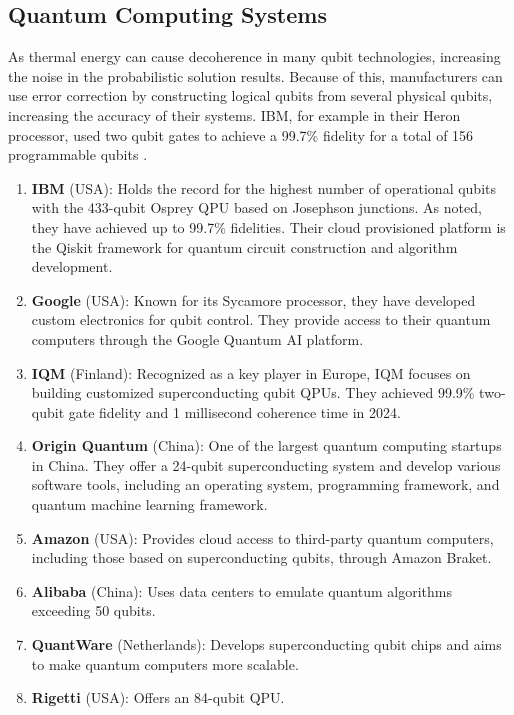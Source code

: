 \subsection{Quantum Computing Systems}

As thermal energy can cause decoherence in many qubit technologies, increasing the noise in the probabilistic solution
results.
Because of this, manufacturers can use error correction by constructing logical qubits from several physical qubits,
increasing the accuracy of their systems.
IBM, for example in their Heron processor, used two qubit gates to achieve a 99.7\% fidelity for a total of 156
programmable qubits \cite{IBM:heronr2:2024}.  

\begin{enumerate}
\item \textbf{IBM} (USA): Holds the record for the highest number of operational qubits with the 433-qubit Osprey QPU
  \cite{IBM:ossprey:2024} based on Josephson junctions.
  As noted, they have achieved up to 99.7\% fidelities.
  Their cloud provisioned platform is the Qiskit \cite{Qiskit:2023} framework for quantum circuit construction and
  algorithm development.
\item \textbf{Google} (USA): Known for its Sycamore processor, they have developed custom electronics for qubit control.
  They provide access to their quantum computers through the Google Quantum AI platform.
\item \textbf{IQM} (Finland): Recognized as a key player in Europe, IQM focuses on building customized superconducting
  qubit QPUs.
  They achieved 99.9\% two-qubit gate fidelity and 1 millisecond coherence time in 2024.
\item \textbf{Origin Quantum} (China):  One of the largest quantum computing startups in China.
  They offer a 24-qubit superconducting system and develop various software tools, including an operating system,
  programming framework, and quantum machine learning framework.
\item \textbf{Amazon} (USA):  Provides cloud access to third-party quantum computers, including those based on
  superconducting qubits, through Amazon Braket.
\item \textbf{Alibaba} (China): Uses data centers to emulate quantum algorithms exceeding 50 qubits.
\item \textbf{QuantWare} (Netherlands):  Develops superconducting qubit chips and aims to make quantum computers more scalable.
\item \textbf{Rigetti} (USA): Offers an 84-qubit QPU.

\end{enumerate}
